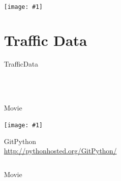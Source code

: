 \documentclass[aspectratio=169]{beamer}
\newcommand{\tallimage}[1]{%
  \begin{frame}
    \centering
    \texttt{[image: \#1]}
    \\
  \end{frame}
}
\newcommand{\wideimage}[1]{%
  \begin{frame}
    \centering
    \texttt{[image: \#1]}
    \\
  \end{frame}
}
\begin{document}
\begin{frame}
  \inputminted[firstline=33, lastline=40]{python}{bng-links.py}
\end{frame}

\wideimage{img/bng-links-2.pdf}

\section{Traffic Data}

\begin{frame}
  \centering\Huge
  TrafficData
  \\
\end{frame}

\begin{frame}
  \inputminted{xml}{TrafficData/content.xml}
\end{frame}

\begin{frame}
  \inputminted{python}{TrafficData/parse.py}
\end{frame}

\begin{frame}
  \inputminted{python}{TrafficData/link_data.py}
\end{frame}

\begin{frame}
  \inputminted{python}{TrafficData/hist.py}
\end{frame}

\begin{frame}
  \centering\Huge
  Movie
  \\
\end{frame}

\tallimage{img/git-repo.png}

\begin{frame}
  \centering\Huge
  GitPython
  \\
  \vspace{\baselineskip}
  \url{http://pythonhosted.org/GitPython/}
  \\
\end{frame}

\begin{frame}
  \inputminted{python}{bng-speed-links.py}
\end{frame}

\begin{frame}
  \centering\Huge
  Movie
  \\
\end{frame}

\begin{frame}
  \inputminted{python}{ephem.py}
\end{frame}
\end{document}
